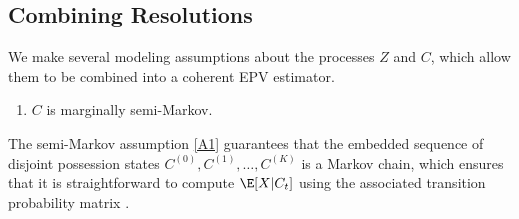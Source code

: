 \documentclass[EPV_JASA.tex]{subfiles}
\begin{document}
\subsection{Combining Resolutions}\label{subsec:multiTheory}
We make several modeling assumptions about the processes $Z$ and $C$, which allow them to be combined into a coherent EPV estimator. %
\begin{enumerate}[label=(A\arabic*)]
    \item $C$ is marginally semi-Markov.\label{A1}
\end{enumerate}
The semi-Markov assumption \ref{A1} guarantees that the embedded sequence of disjoint possession states $C^{(0)}, C^{(1)}, \ldots, C^{(K)}$ is a Markov chain, which ensures that it is straightforward to compute $\E[X | C_t]$ using the associated transition probability matrix \cite{kemeny1976finite}.
\end{document}

